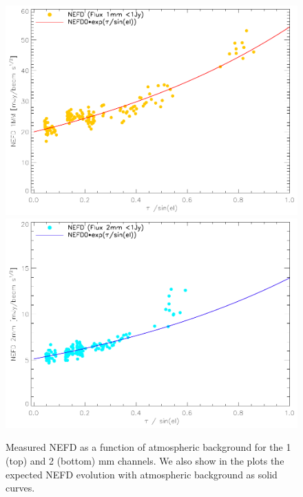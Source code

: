 \begin{figure}
\begin{center}
\includegraphics[clip, angle=0, scale =0.8]{Figures/NEFDIndScans/nefd_1mm_R9_F1_tau_run22_23.pdf}
\includegraphics[clip, angle=0, scale =0.8]{Figures/NEFDIndScans/nefd_2mm_R9_F1_tau_run22_23.pdf}
\caption{Measured NEFD as a function of atmospheric background for the 1 (top) and 2 (bottom) mm channels. We also show in the plots the expected NEFD evolution with atmospheric background as solid curves.}
\label{fig:nefdvsbackground}
\end{center}
\end{figure}

